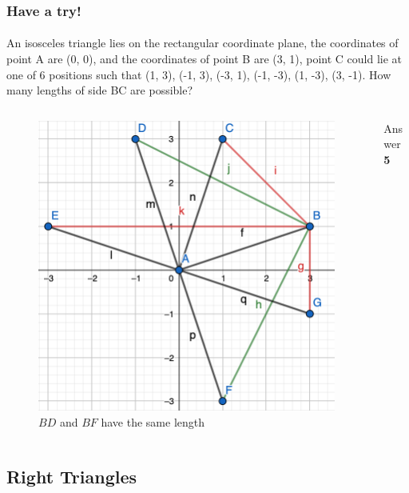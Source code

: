 \documentclass[
	11pt, %
]{beamer}
\begin{document}


\begin{frame}
	\frametitle{Have a try!}
	\framesubtitle{}
An isosceles triangle lies on the rectangular coordinate plane, the coordinates of
point A are (0, 0), and the coordinates of point B are (3, 1), point C could lie at one of
6 positions such that (1, 3), (-1, 3), (-3, 1), (-1, -3), (1, -3), (3, -1). How many lengths of
side BC are possible?\\
	\begin{columns}[t] 
		\begin{column}{0.8\textwidth} %
		\begin{figure}
			\includegraphics[width=0.5\linewidth]{Isosceles_Example_Question1.png}
			\caption{$BD$ and $BF$ have the same length}
		\end{figure}
		\end{column}
		\begin{column}{0.2\textwidth} %
		\pause
		\bigskip
		Answer \textbf{5}
		\end{column}
	\end{columns}
\end{frame}


\subsection{Right Triangles}

\end{document}
